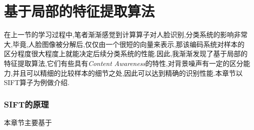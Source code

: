 \chapter{基于局部的特征提取算法}
在上一节的学习过程中,笔者渐渐感觉到计算算子对人脸识别,分类系统的影响非常大,毕竟,人脸图像被分解后,仅仅由一个很短的向量来表示,那该编码系统对样本的区分程度很大程度上就能决定后续分类系统的性能.因此,我渐渐发现了基于局部的特征提取算法,它们有些具有\textit{Content Awareness}的特性,对背景噪声有一定的区分能力,并且可以精细的比较样本的细节之处,因此可以达到精确的识别性能.本章节以SIFT算子为例做介绍.
\subsection{SIFT的原理}
本章节主要基于\cite{lowe2004distinctive, issolah2013sift, juan2009comparison, siftopencv, siftvlfeat, siftubc,lowe1999object}\newline

